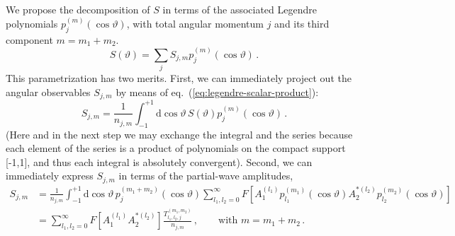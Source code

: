 \documentclass[aps,prd,reprint,nofootinbib,preprintnumbers]{revtex4}
\newcommand{\refeq}[1]{eq.~(\ref{eq:#1})}
\newcommand{\rmdx}[1]{\mbox{d} #1 \,} %
\renewcommand{\theta}{\vartheta}
\begin{document}
We propose the decomposition of $S$ in terms of the associated Legendre polynomials $p_{j}^{(m)}(\cos\theta)$,
with total angular momentum $j$ and its third component $m=m_1 + m_2$.
\begin{equation}
    S(\theta) = \sum_j S_{j,m} p_{j}^{(m)}(\cos\theta)\,.
\end{equation}
This parametrization has two merits. First, we can immediately project out the angular observables $S_{j,m}$ by means of \refeq{legendre-scalar-product}:
\begin{equation}
    S_{j,m} = \frac{1}{n_{j,m}} \int_{-1}^{+1} \rmdx{\cos\theta} S(\theta) p_{j}^{(m)}(\cos\theta)\,.
\end{equation}
(Here and in the next step we may exchange the integral and the
series because each element of the series is a product of
polynomials on the compact support [-1,1], and thus each integral
is absolutely convergent).
Second, we can immediately express $S_{j,m}$ in terms of
the partial-wave amplitudes,
\begin{equation}
    \label{eq:partial-wave-observable-infinite}
    \begin{aligned}
        S_{j,m}
            & = \frac{1}{n_{j,m}} \int_{-1}^{+1} \rmdx{\cos\theta} p_{j}^{(m_1 + m_2)}(\cos\theta) \sum_{l_1,l_2=0}^\infty F\left[A_{1}^{(l_1)} p_{l_1}^{(m_1)}(\cos\theta) A_{2}^{*(l_2)}p_{l_2}^{(m_2)}(\cos\theta)\right]\\
            & = \sum_{l_1,l_2=0}^\infty F\left[A_{1}^{(l_1)} A_{2}^{*(l_2)}\right] \frac{T_{l_1,l_2,j}^{(m_1,m_2)}}{n_{j,m}}\,,\qquad\text{with }m = m_1 + m_2\,.
    \end{aligned}
\end{equation}
\end{document}
